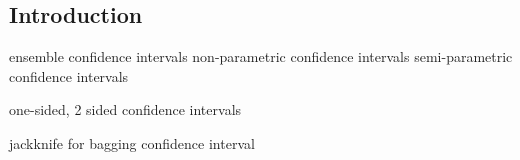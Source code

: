 
\subsection{Introduction}

ensemble confidence intervals
non-parametric confidence intervals
semi-parametric confidence intervals

one-sided, 2 sided confidence intervals

jackknife for bagging confidence interval
